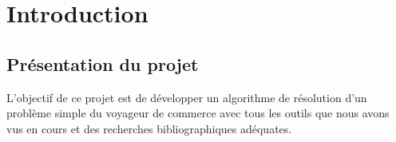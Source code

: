 \section{Introduction}

  \subsection{Présentation du projet}
    L’objectif de ce projet est de développer un algorithme de résolution d'un problème simple du voyageur de commerce avec tous les outils que nous avons vus en cours et des recherches bibliographiques adéquates.
